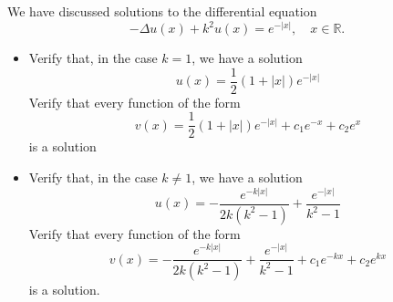 \documentclass[11pt]{article}
\begin{document}
\begin{exercise}
    We have discussed solutions to the differential equation 
    \[
        - \Delta u(x) + k^2 u(x) = e^{-|x|}, \quad x \in \mathbb R.
    \]
    \begin{itemize}
        \item 
        Verify that, in the case $k=1$, we have a solution 
        \[
            u(x) = \frac 1 2 (1+|x|) e^{-|x|} 
        \]
        Verify that every function of the form 
        \[
            v(x) = \frac 1 2 (1+|x|) e^{-|x|} + c_1 e^{-x} + c_2 e^{x} 
        \]
        is a solution 
        \item 
        Verify that, in the case $k \neq 1$, we have a solution 
        \[
            u(x) = - \frac{ e^{-k|x|} }{ 2k (k^2-1) } + \frac{ e^{-|x|} }{ k^2-1 }
        \]
        Verify that every function of the form 
        \[
            v(x) = - \frac{ e^{-k|x|} }{ 2k (k^2-1) } + \frac{ e^{-|x|} }{ k^2-1 } + c_1 e^{-kx} + c_2 e^{kx} 
        \]        
        is a solution.
    \end{itemize}
\end{exercise}
\begin{solution}     
\end{solution}

% 
\end{document}
